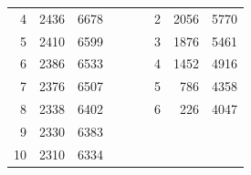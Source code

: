 \documentclass[a4paper, 12pt]{article}%
\begin{document}
\begin{table}[H]
\begin{center}
{\begin{tabular}{|rrr|rrrrrr}
					\multicolumn{1}{|r|}{4}     & \multicolumn{1}{r|}{2436}            & 6678                                                 &                      &                      & \multicolumn{1}{r|}{} & \multicolumn{1}{r|}{2}     & \multicolumn{1}{r|}{2056}            & \multicolumn{1}{r|}{5770}                            \\ \cline{1-3} \cline{7-9} 
					\multicolumn{1}{|r|}{5}     & \multicolumn{1}{r|}{2410}            & 6599                                                 &                      &                      & \multicolumn{1}{r|}{} & \multicolumn{1}{r|}{3}     & \multicolumn{1}{r|}{1876}            & \multicolumn{1}{r|}{5461}                            \\ \cline{1-3} \cline{7-9} 
					\multicolumn{1}{|r|}{6}     & \multicolumn{1}{r|}{2386}            & 6533                                                 &                      &                      & \multicolumn{1}{r|}{} & \multicolumn{1}{r|}{4}     & \multicolumn{1}{r|}{1452}            & \multicolumn{1}{r|}{4916}                            \\ \cline{1-3} \cline{7-9} 
					\multicolumn{1}{|r|}{7}     & \multicolumn{1}{r|}{2376}            & 6507                                                 &                      &                      & \multicolumn{1}{r|}{} & \multicolumn{1}{r|}{5}     & \multicolumn{1}{r|}{786}             & \multicolumn{1}{r|}{4358}                            \\ \cline{1-3} \cline{7-9} 
					\multicolumn{1}{|r|}{8}     & \multicolumn{1}{r|}{2338}            & 6402                                                 &                      &                      & \multicolumn{1}{r|}{} & \multicolumn{1}{r|}{6}     & \multicolumn{1}{r|}{226}             & \multicolumn{1}{r|}{4047}                            \\ \cline{1-3} \cline{7-9} 
					\multicolumn{1}{|r|}{9}     & \multicolumn{1}{r|}{2330}            & 6383                                                 &                      &                      &                       &                            &                                      &                                                      \\ \cline{1-3}
					\multicolumn{1}{|r|}{10}    & \multicolumn{1}{r|}{2310}            & 6334                                                 &                      &                      &                       &                            &                                      &                                                      \\ \cline{1-3}

\end{tabular}}
\end{center}
\end{table}
\end{document}
